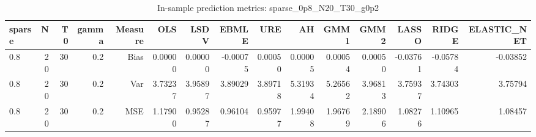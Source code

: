 \begin{table}[!htbp]\centering
\caption{In-sample prediction metrics: sparse_0p8_N20_T30_g0p2}
\label{tab:table2_sparse_0p8_N20_T30_g0p2}
\begin{tabular}{lrrrrrrrrrrrrrr}
\hline
sparse & N & T0 & gamma & Measure & OLS & LSDV & EBMLE & URE & AH & GMM1 & GMM2 & LASSO & RIDGE & ELASTIC_NET \\
\hline
0.8 & 20 & 30 & 0.2 & Bias & 0.00000 & 0.00000 & -0.00075 & 0.00050 & 0.00005 & 0.00054 & 0.00050 & -0.03761 & -0.05784 & -0.03852 \\
0.8 & 20 & 30 & 0.2 & Var & 3.73237 & 3.95897 & 3.89029 & 3.89718 & 5.31934 & 5.26562 & 3.96813 & 3.75937 & 3.74303 & 3.75794 \\
0.8 & 20 & 30 & 0.2 & MSE & 1.17900 & 0.95287 & 0.96104 & 0.95977 & 1.99408 & 1.96769 & 2.18906 & 1.08276 & 1.10965 & 1.08457 \\
\hline
\end{tabular}
\end{table}

